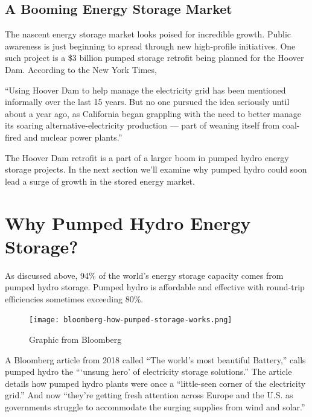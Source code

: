 \documentclass[hidelinks,12pt,a4paper]{article}
\begin{document}
\subsection{A Booming Energy Storage Market}
The nascent energy storage market looks poised for incredible growth. Public awareness is just beginning to spread through new high-profile initiatives. One such project is a \$3 billion pumped storage retrofit being planned for the Hoover Dam. According to the New York Times,

\begin{displayquote}
“Using Hoover Dam to help manage the electricity grid has been mentioned informally over the last 15 years. But no one pursued the idea seriously until about a year ago, as California began grappling with the need to better manage its soaring alternative-electricity production — part of weaning itself from coal-fired and nuclear power plants.” \cite{The3BillionPlanToTurnHooverDamIntoAGiantBattery}
\end{displayquote}

The Hoover Dam retrofit is a part of a larger boom in pumped hydro energy storage projects. In the next section we'll examine why pumped hydro could soon lead a surge of growth in the stored energy market.

\pagebreak[4]
\section{Why Pumped Hydro Energy Storage?}
As discussed above, 94\% of the world's energy storage capacity comes from pumped hydro storage. \cite{ElectricStorageCapacityInTheUnitedStates} Pumped hydro is affordable and effective with round-trip efficiencies sometimes exceeding 80\%. \cite{ESAPumpedHydroelectricStorage}

\begin{figure}[ht!]
    \centering
    \texttt{[image: bloomberg-how-pumped-storage-works.png]}
    \caption{Graphic from Bloomberg \cite{QuestforBiggerBatteries}}
\end{figure}
\FloatBarrier

A Bloomberg article from 2018 called “The world's most beautiful Battery,” calls pumped hydro the “‘unsung hero’ of electricity storage solutions.” \cite{MostBeautifulBattery} The article details how pumped hydro plants were once a “little-seen corner of the electricity grid.” And now “they’re getting fresh attention across Europe and the U.S. as governments struggle to accommodate the surging supplies from wind and solar.” \cite{MostBeautifulBattery}
\end{document}

